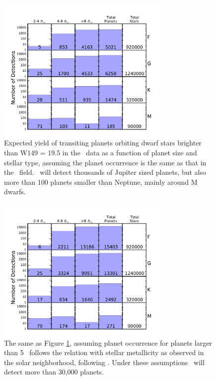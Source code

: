 \begin{figure}[htbp!]
\centerline{\includegraphics[width=0.75\textwidth]{chapter8/f5b_n.pdf}}
\caption[Expected transiting planet yield from \WF\ assuming planet occurrence is the same as that in
the \kep\ field]{Expected yield of transiting planets orbiting dwarf stars
  brighter than W149 = 19.5 in the \WF\ data as a function of
  planet size and stellar type, assuming the planet occurrence is the same as that in the \kep\ 
  field. \WF\ will detect thousands of Jupiter sized planets, but also more than 100 planets
  smaller than Neptune, mainly around M dwarfs. }
\label{fig:yield1}
\end{figure}


\begin{figure}[htbp!]
\centerline{\includegraphics[width=0.75\textwidth]{chapter8/f5a_n.pdf}}
\caption[Expected transiting planet yield from \WF\ assuming giant planet occurrence follows the same
relation with metallicity as observed in the solar neighborhood]{The same as Figure \ref{fig:yield1}, assuming planet occurrence for planets
larger than 5 \rearth\ follows
the relation with stellar metallicity as observed in the solar neighborhood,
following \citet{JohnsonApps09}. Under these assumptions \WF\ will detect 
more than 30,000 planets.}
\label{fig:yield2}
\end{figure}



